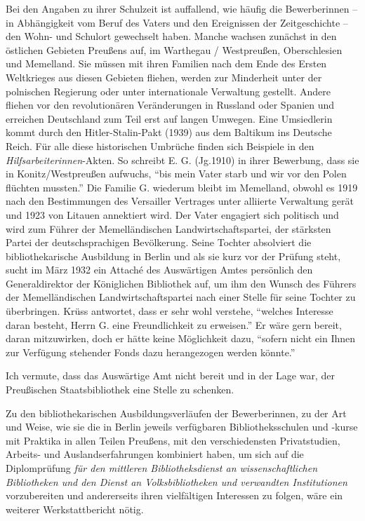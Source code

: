 \documentclass[a4paper,
fontsize=11pt,
oneside,
numbers=noperiodatend,
parskip=half-,
bibliography=totoc,
final
]{scrartcl}
\begin{document}
Bei den Angaben zu ihrer Schulzeit ist auffallend, wie häufig die
Bewerberinnen -- in Abhängig\-keit vom Beruf des Vaters und den
Ereignissen der Zeitgeschichte -- den Wohn- und Schulort gewechselt
haben. Manche wachsen zunächst in den östlichen Gebieten Preußens auf,
im Warthegau / Westpreußen, Oberschlesien und Memelland. Sie müssen mit
ihren Familien nach dem Ende des Ersten Weltkrieges aus diesen Gebieten
fliehen, werden zur Minderheit unter der polnischen Regierung oder unter
internationale Verwaltung gestellt. Andere fliehen vor den
revolutionären Veränderungen in Russland oder Spanien und erreichen
Deutschland zum Teil erst auf langen Umwegen. Eine Umsiedlerin kommt
durch den Hitler-Stalin-Pakt (1939) aus dem Baltikum ins Deutsche Reich.
Für alle diese historischen Umbrüche finden sich Beispiele in den
\emph{Hilfsarbeiterinnen}-Akten. So schreibt E. G. (Jg.1910) in ihrer
Bewerbung, dass sie in Konitz/Westpreußen aufwuchs, \enquote{bis mein
Vater starb und wir vor den Polen flüchten mussten.} Die Familie G.
wiederum bleibt im Memelland, obwohl es 1919 nach den Bestimmungen des
Versailler Vertrages unter alliierte Verwaltung gerät und 1923 von
Litauen annektiert wird. Der Vater engagiert sich politisch und wird zum
Führer der Memelländischen Landwirtschaftspartei, der stärksten Partei
der deutschsprachigen Bevölkerung. Seine Tochter absolviert die
bibliothekarische Ausbildung in Berlin und als sie kurz vor der Prüfung
steht, sucht im März 1932 ein Attaché des Auswärtigen Amtes persönlich
den Generaldirektor der Königlichen Bibliothek auf, um ihm den Wunsch
des Führers der Memelländischen Landwirtschaftspartei nach einer Stelle
für seine Tochter zu überbringen. Krüss antwortet, dass er sehr wohl
verstehe, \enquote{welches Interesse daran besteht, Herrn G. eine
Freundlichkeit zu erweisen.} Er wäre gern bereit, daran mitzuwirken,
doch er hätte keine Möglichkeit dazu, \enquote{sofern nicht ein Ihnen
zur Verfügung stehender Fonds dazu herangezogen werden könnte.}

Ich vermute, dass das Auswärtige Amt nicht bereit und in der Lage war,
der Preußischen Staatsbibliothek eine Stelle zu schenken.

Zu den bibliothekarischen Ausbildungsverläufen der Bewerberinnen, zu der
Art und Weise, wie sie die in Berlin jeweils verfügbaren
Bibliotheksschulen und -kurse mit Praktika in allen Teilen Preußens, mit
den verschiedensten Privatstudien, Arbeits- und Auslandserfahrungen
kombiniert haben, um sich auf die Diplomprüfung \emph{für den mittleren
Bibliotheksdienst an wissenschaftlichen Bibliotheken und den Dienst an
Volksbibliotheken und verwandten Institutionen} vorzubereiten und
andererseits ihren vielfältigen Interessen zu folgen, wäre ein weiterer
Werkstattbericht nötig.
\end{document}

